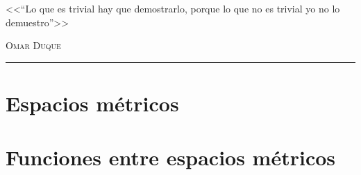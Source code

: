 \documentclass[12pt,a4paper]{book}
\begin{document}
\renewcommand{\contentsname}{\vspace{-1.5cm}\centering Contenido \vspace{-2cm} }


\begin{titlepage}
\vspace*{2cm}

\noindent
\vspace*{0.5cm}

\vspace{1.5cm}
\epigraph{<<``Lo que es trivial hay que demostrarlo, porque lo que no es trivial yo no lo demuestro''>>}%
{ \textsc{Omar Duque}}
\null\vfill
\vspace*{1cm}
\noindent
\hfill
\begin{minipage}{0.7\linewidth}
    \begin{flushright}
        \printauthor
    \end{flushright}
\end{minipage}
%
\begin{minipage}{0.02\linewidth}
    \rule{1pt}{140pt}
\end{minipage}
\titlepagedecoration
\end{titlepage}


\tableofcontents
\cleardoublepage


\chapter{Espacios métricos}

\chapter{Funciones entre espacios métricos}

\end{document}
